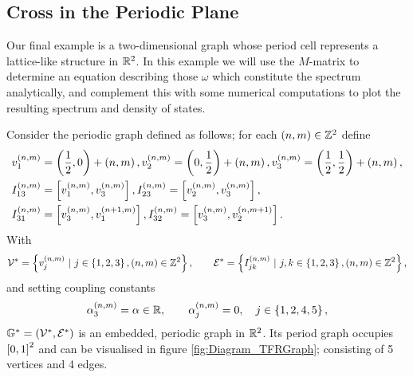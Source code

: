\subsection{Cross in the Periodic Plane} \label{ssec:ExampleCrossInPlane}
Our final example is a two-dimensional graph whose period cell represents a lattice-like structure in $\mathbb{R}^2$.
In this example we will use the $M$-matrix to determine an equation describing those $\omega$ which constitute the spectrum analytically, and complement this with some numerical computations to plot the resulting spectrum and density of states.

Consider the periodic graph defined as follows; for each $\left( n,m \right)\in\mathbb{Z}^2$ define
\begin{align*}
	& v_1^{\left( n,m \right)} = \left( \frac{1}{2},0 \right) + \left( n,m \right), 
	v_2^{\left( n,m \right)} = \left( 0,\frac{1}{2} \right) + \left( n,m \right),
	v_3^{\left( n,m \right)} = \left( \frac{1}{2},\frac{1}{2} \right) + \left( n,m \right), \\
	& I_{13}^{\left( n,m \right)} = \left[ v_1^{\left( n,m \right)}, v_3^{\left( n,m \right)} \right],
	I_{23}^{\left( n,m \right)} = \left[ v_2^{\left( n,m \right)}, v_3^{\left( n,m \right)} \right], \\
	& I_{31}^{\left( n,m \right)} = \left[ v_3^{\left( n,m \right)}, v_1^{\left( n+1,m \right)} \right],
	I_{32}^{\left( n,m \right)} = \left[ v_3^{\left( n,m \right)}, v_2^{\left( n,m+1 \right)} \right].
\end{align*}
With 
\begin{align*}
	\vertSet^* = \clbracs{v_j^{\bracs{n,m}} \ \vert \ j\in\clbracs{1,2,3}, \bracs{n,m}\in\integers^2},
	\qquad \edgeSet^* = \clbracs{I_{jk}^{\bracs{n,m}} \ \vert \ j,k\in\clbracs{1,2,3}, \bracs{n,m}\in\integers^2},
\end{align*}
and setting coupling constants
\begin{align*}
	\alpha_3^{\left( n,m \right)} = \alpha \in\mathbb{R}, 
	\qquad \alpha_j^{\left( n,m \right)} = 0, \quad j\in\left\{ 1,2,4,5 \right\},
\end{align*}
$\mathbb{G}^* = \left( \mathcal{V}^*,\mathcal{E}^* \right)$ is an embedded, periodic graph in $\mathbb{R}^2$.
Its period graph occupies $\left[ 0,1 \right]^2$ and can be visualised in figure \ref{fig:Diagram_TFRGraph}; consisting of 5 vertices and 4 edges.
